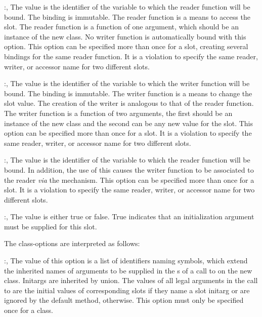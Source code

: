 \begin{optDefinition}
\begin{options}
    \item[\keyworddef{reader}:, \scref{identifier}]%
    The value is the identifier of the variable to which the reader function
    will be bound.  The binding is immutable.  The reader function is a means to
    access the slot.  The reader function is a function of one argument, which
    should be an instance of the new class.  No writer function is automatically
    bound with this option.  This option can be specified more than once for a
    slot, creating several bindings for the same reader function. It is a
    violation to specify the same reader, writer, or accessor name for two
    different slots.

    \item[\keyworddef{writer}:, \scref{identifier}]%
    The value is the identifier of the variable to which the writer function
    will be bound.  The binding is immutable.  The writer function is a means to
    change the slot value.  The creation of the writer is analogous to that of
    the reader function. The writer function is a function of two arguments, the
    first should be an instance of the new class and the second can be any new
    value for the slot.  This option can be specified more than once for a slot.
    It is a violation to specify the same reader, writer, or accessor name
    for two different slots.

    \item[\keyworddef{accessor}:, \scref{identifier}]%
    The value is the identifier of the variable to which the reader function
    will be bound. In addition, the use of this  causes the
    writer function to be associated to the reader {\em via\/} the
     mechanism. This option can be specified more than once
    for a slot. It is a violation to specify the same reader, writer, or
    accessor name for two different slots.

    \item[\keyworddef{requiredp}:, \scref{boolean}]%
    The value is either true or false. True indicates that an initialization
    argument must be supplied for this slot.
\end{options}
%
The class-options are interpreted as follows:
%
\begin{options}
    \item[\keyworddef{keywords}:, \scref{list}]%
    The value of this option is a list of identifiers naming symbols, which
    extend the inherited names of arguments to be supplied in the
    s of a call to  on the new class. Initargs
    are inherited by union. The values of all legal arguments in the call to
     are the initial values of corresponding slots if they
    name a slot initarg or are ignored by the default 
    method, otherwise. This option must only be specified once for a class.


\end{options}
\end{optDefinition}
